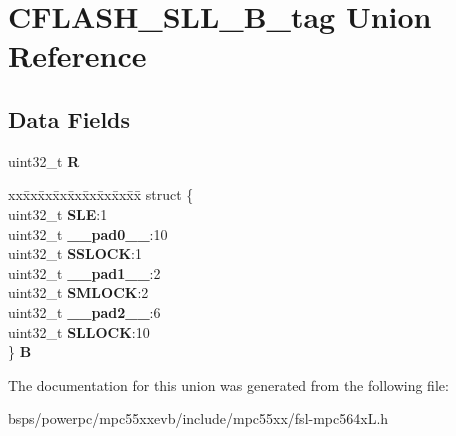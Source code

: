 \hypertarget{unionCFLASH__SLL__32B__tag}{}\section{C\+F\+L\+A\+S\+H\+\_\+\+S\+L\+L\+\_\+B\+\_\+tag Union Reference}
\label{unionCFLASH__SLL__32B__tag}
\subsection*{Data Fields}
\begin{DoxyCompactItemize}
\item 
\mbox{\label{unionCFLASH__SLL__32B__tag_a83637a1977a92ca94050994d4d13df30}} 
uint32\+\_\+t {\bfseries R}
\item 
\mbox{\label{unionCFLASH__SLL__32B__tag_a46122cc6acfe88877465e0c4357ac2f5}} 
\begin{tabbing}
xx\=xx\=xx\=xx\=xx\=xx\=xx\=xx\=xx\=\kill
struct \{\\
\>uint32\_t {\bfseries SLE}:1\\
\>uint32\_t {\bfseries \_\_pad0\_\_}:10\\
\>uint32\_t {\bfseries SSLOCK}:1\\
\>uint32\_t {\bfseries \_\_pad1\_\_}:2\\
\>uint32\_t {\bfseries SMLOCK}:2\\
\>uint32\_t {\bfseries \_\_pad2\_\_}:6\\
\>uint32\_t {\bfseries SLLOCK}:10\\
\} {\bfseries B}\\

\end{tabbing}\end{DoxyCompactItemize}


The documentation for this union was generated from the following file\+:\begin{DoxyCompactItemize}
\item 
bsps/powerpc/mpc55xxevb/include/mpc55xx/fsl-\/mpc564x\+L.\+h\end{DoxyCompactItemize}
